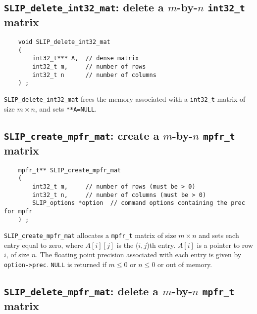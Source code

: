 \documentclass[12pt]{article}
\theoremstyle{definition}
\begin{document}
\cprotect\subsection{\verb|SLIP_delete_int32_mat|: delete a $m$-by-$n$ \verb|int32_t| matrix}

\begin{mdframed}[userdefinedwidth=6in]
{\footnotesize
\begin{verbatim}
    void SLIP_delete_int32_mat
    (
        int32_t*** A,  // dense matrix
        int32_t m,     // number of rows
        int32_t n      // number of columns
    ) ;
\end{verbatim}
} \end{mdframed}

\verb|SLIP_delete_int32_mat| frees the memory associated with a \verb|int32_t|
matrix of size $m \times n$, and sets \verb|**A=NULL|.

\cprotect\subsection{\verb|SLIP_create_mpfr_mat|: create a $m$-by-$n$ \verb|mpfr_t| matrix}
\label{ss:create_mpfr_mat}

\begin{mdframed}[userdefinedwidth=6in]
{\footnotesize
\begin{verbatim}
    mpfr_t** SLIP_create_mpfr_mat
    (
        int32_t m,     // number of rows (must be > 0)
        int32_t n,     // number of columns (must be > 0)
        SLIP_options *option  // command options containing the prec for mpfr
    ) ;
\end{verbatim}
} \end{mdframed}


\verb|SLIP_create_mpfr_mat| allocates a \verb|mpfr_t| matrix of size $m \times
n$ and sets each entry equal to zero, where $A[i][j]$ is the ($i,j$)th entry.
$A[i]$ is a pointer to row $i$, of size $n$. The floating point precision
associated with each entry is given by \verb|option->prec|. \verb|NULL| is returned if
$m \le 0 $ or $n\le 0$ or out of memory.


\cprotect\subsection{\verb|SLIP_delete_mpfr_mat|: delete a $m$-by-$n$ \verb|mpfr_t| matrix}
\end{document}
